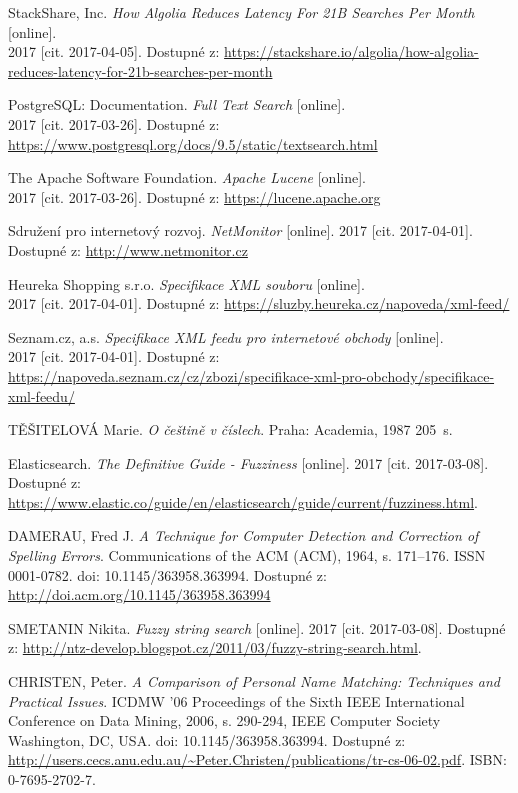 \documentclass[FM,DP]{tulthesis}
\begin{document}
\begin{thebibliography}{Mm99}
 StackShare, Inc. 
\emph{How Algolia Reduces Latency For 21B Searches Per Month} [online].\\
2017 [cit. 2017-04-05]. Dostupné z:
\url{https://stackshare.io/algolia/how-algolia-reduces-latency-for-21b-searches-per-month}

 PostgreSQL: Documentation. \emph{Full Text Search} [online].\\
2017 [cit. 2017-03-26]. Dostupné z: \url{https://www.postgresql.org/docs/9.5/static/textsearch.html}

 The Apache Software Foundation. \emph{Apache Lucene} [online].\\
2017 [cit. 2017-03-26]. Dostupné z: \url{https://lucene.apache.org}

 Sdružení pro internetový rozvoj. \emph{NetMonitor} [online].
2017 [cit. 2017-04-01]. Dostupné z: \url{http://www.netmonitor.cz}

 Heureka Shopping s.r.o. \emph{Specifikace XML souboru} [online].\\
2017 [cit. 2017-04-01]. Dostupné z: \url{https://sluzby.heureka.cz/napoveda/xml-feed/}

 Seznam.cz, a.s. \emph{Specifikace XML feedu pro internetové obchody} [online].\\
2017 [cit. 2017-04-01]. Dostupné z:
\url{https://napoveda.seznam.cz/cz/zbozi/specifikace-xml-pro-obchody/specifikace-xml-feedu/}

 TĚŠITELOVÁ Marie. \emph{O češtině v číslech}.
Praha: Academia, 1987 205~s.

 Elasticsearch. \emph{The Definitive Guide - Fuzziness} [online].
2017 [cit. 2017-03-08]. Dostupné z:
\url{https://www.elastic.co/guide/en/elasticsearch/guide/current/fuzziness.html}.

 DAMERAU, Fred J. \emph{A Technique for Computer Detection and Correction of Spelling Errors}.
Communications of the ACM (ACM), 1964, s. 171–176. ISSN 0001-0782. doi: 10.1145/363958.363994.
Dostupné z: \url{http://doi.acm.org/10.1145/363958.363994}

 SMETANIN Nikita. \emph{Fuzzy string search} [online].
2017 [cit. 2017-03-08]. 
Dostupné z: \url{http://ntz-develop.blogspot.cz/2011/03/fuzzy-string-search.html}.

 CHRISTEN, Peter. \emph{A Comparison of Personal Name Matching: Techniques and Practical Issues}.
ICDMW '06 Proceedings of the Sixth IEEE International Conference on Data Mining, 2006, s. 290-294,
IEEE Computer Society Washington, DC, USA. doi: 10.1145/363958.363994. 
Dostupné z: \url{http://users.cecs.anu.edu.au/~Peter.Christen/publications/tr-cs-06-02.pdf}. 
ISBN: 0-7695-2702-7.

\end{thebibliography}
\end{document}
